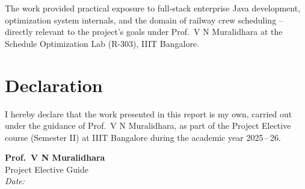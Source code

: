 \documentclass[12pt,a4paper]{article}
\begin{document}
The work provided practical exposure to full-stack enterprise Java development,
optimization system internals, and the domain of railway crew scheduling --
directly relevant to the project's goals under Prof.\ V N Muralidhara
at the Schedule Optimization Lab (R-303), IIIT Bangalore.

\section*{Declaration}

I hereby declare that the work presented in this report is my own, carried out
under the guidance of Prof.\ V N Muralidhara, as part of the Project Elective
course (Semester II) at IIIT Bangalore during the academic year 2025\,--\,26.

\vspace{4em}
\begin{flushright}
\textbf{Prof.\ V N Muralidhara}\\[0.3em]
Project Elective Guide\\[2em]
\textit{Date:}~\underline{\hspace{4cm}}
\end{flushright}
\end{document}
